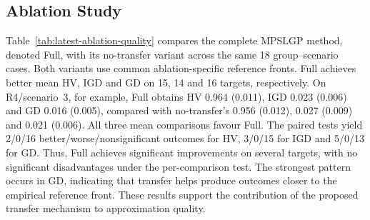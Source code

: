 \documentclass[10pt,journal]{IEEEtran}
\begin{document}
\subsection{Ablation Study}
Table~\ref{tab:latest-ablation-quality} compares the complete MPSLGP method, denoted Full, with its no-transfer variant across the same 18 group--scenario cases. Both variants use common ablation-specific reference fronts. Full achieves better mean HV, IGD and GD on 15, 14 and 16 targets, respectively. On R4/scenario~3, for example, Full obtains HV 0.964 (0.011), IGD 0.023 (0.006) and GD 0.016 (0.005), compared with no-transfer's 0.956 (0.012), 0.027 (0.009) and 0.021 (0.006). All three mean comparisons favour Full. The paired tests yield 2/0/16 better/worse/nonsignificant outcomes for HV, 3/0/15 for IGD and 5/0/13 for GD. Thus, Full achieves significant improvements on several targets, with no significant disadvantages under the per-comparison test. The strongest pattern occurs in GD, indicating that transfer helps produce outcomes closer to the empirical reference front. These results support the contribution of the proposed transfer mechanism to approximation quality.
\end{document}
